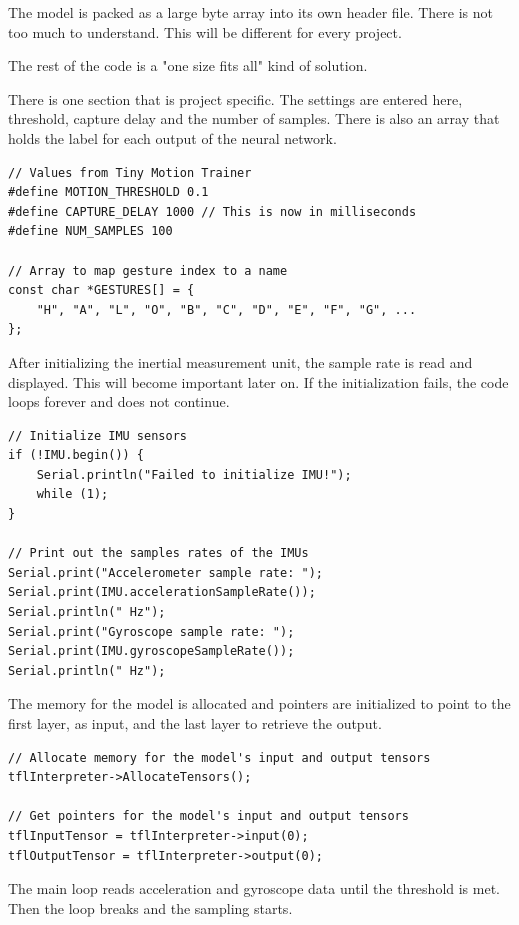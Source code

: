 \documentclass[a4paper,titlepage]{article}
\begin{document}
The model is packed as a large byte array into its own header file.
There is not too much to understand.
This will be different for every project.

The rest of the code is a "one size fits all" kind of solution.

There is one section that is project specific.
The settings are entered here, threshold, capture delay and the number of samples.
There is also an array that holds the label for each output of the neural network.

\begin{lstlisting}
// Values from Tiny Motion Trainer
#define MOTION_THRESHOLD 0.1
#define CAPTURE_DELAY 1000 // This is now in milliseconds
#define NUM_SAMPLES 100

// Array to map gesture index to a name
const char *GESTURES[] = {
    "H", "A", "L", "O", "B", "C", "D", "E", "F", "G", ...
};
\end{lstlisting}

After initializing the inertial measurement unit, the sample rate is read and displayed.
This will become important later on.
If the initialization fails, the code loops forever and does not continue.

\begin{lstlisting}
// Initialize IMU sensors
if (!IMU.begin()) {
    Serial.println("Failed to initialize IMU!");
    while (1);
}

// Print out the samples rates of the IMUs
Serial.print("Accelerometer sample rate: ");
Serial.print(IMU.accelerationSampleRate());
Serial.println(" Hz");
Serial.print("Gyroscope sample rate: ");
Serial.print(IMU.gyroscopeSampleRate());
Serial.println(" Hz");
\end{lstlisting}

The memory for the model is allocated and pointers are initialized to point to the first layer, as input, and the last layer to retrieve the output.

\begin{lstlisting}
// Allocate memory for the model's input and output tensors
tflInterpreter->AllocateTensors();

// Get pointers for the model's input and output tensors
tflInputTensor = tflInterpreter->input(0);
tflOutputTensor = tflInterpreter->output(0);
\end{lstlisting}

The main loop reads acceleration and gyroscope data until the threshold is met.
Then the loop breaks and the sampling starts.
\end{document}
